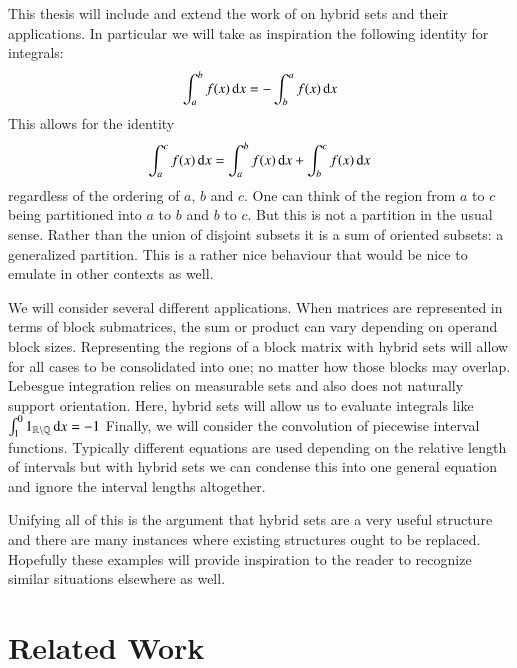 This thesis will include and extend the work of \cite{carette2010} on hybrid sets and their applications.
In particular we will take as inspiration the following identity for integrals:
\begin{equation}
	\int_a^b f(x) \mathop{}\!\mathrm{d} x = -\int_b^a f(x) \mathop{}\!\mathrm{d} x
\end{equation}
This allows for the identity
\begin{equation}
	\int_a^c f(x) \mathop{}\!\mathrm{d} x = \int_a^b f(x) \mathop{}\!\mathrm{d} x + \int_b^c f(x) \mathop{}\!\mathrm{d} x
\end{equation}
regardless of the ordering of $a$, $b$ and $c$.
One can think of the region from $a$ to $c$ being partitioned into $a$ to $b$ and $b$ to $c$.
But this is not a partition in the usual sense.
Rather than the union of disjoint subsets it is a sum of oriented subsets: a generalized partition.
This is a rather nice behaviour that would be nice to emulate in other contexts as well.


We will consider several different applications.
When matrices are represented in terms of block submatrices, 
the sum or product can vary depending on operand block sizes.
Representing the regions of a block matrix with hybrid sets will allow for all cases to be consolidated into one;
no matter how those blocks may overlap.
Lebesgue integration relies on measurable sets and also does not naturally support orientation.
Here, hybrid sets will allow us to evaluate integrals like $\int_1^0 1_{\mathbb{R} \setminus \mathbb{Q}} \mathop{}\!\mathrm{d} x = -1$
Finally, we will consider the convolution of piecewise interval functions.
Typically different equations are used depending on the relative length of intervals but with hybrid sets we can condense this
into one general equation and ignore the interval lengths altogether.


Unifying all of this is the argument that hybrid sets are a very useful structure and there are many instances where existing
structures ought to be replaced.
Hopefully these examples will provide inspiration to the reader to recognize similar situations elsewhere as well.




\section{Related Work}


